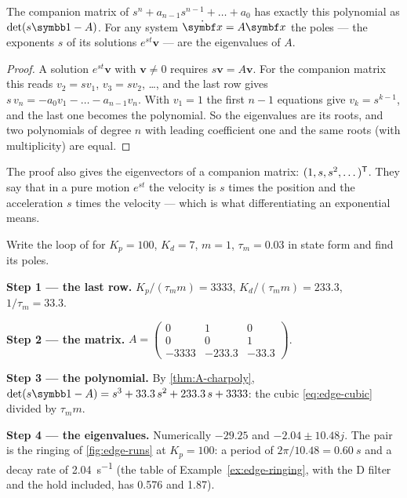 \begin{theorem}
\label{thm:A-charpoly}
The companion matrix of $s^n + a_{n-1}s^{n-1} + \dots + a_0$ has exactly this polynomial as $\det(s\Id - A)$. For any system $\dot{\vx} = A\vx$ the poles — the exponents $s$ of its solutions $e^{st}\symbf v$ — are the eigenvalues of $A$.
\end{theorem}
\begin{proof}
A solution $e^{st}\symbf v$ with $\symbf v \ne 0$ requires $s\symbf v = A\symbf v$. For the companion matrix this reads $v_2 = s v_1$, $v_3 = s v_2$, \dots, and the last row gives $s\,v_n = -a_0v_1 - \dots - a_{n-1}v_n$. With $v_1 = 1$ the first $n - 1$ equations give $v_k = s^{k-1}$, and the last one becomes the polynomial. So the eigenvalues are its roots, and two polynomials of degree $n$ with leading coefficient one and the same roots (with multiplicity) are equal.
\end{proof}

The proof also gives the eigenvectors of a companion matrix: $(1, s, s^2, \dots)^{\mathsf{T}}$. They say that in a pure motion $e^{st}$ the velocity is $s$ times the position and the acceleration $s$ times the velocity — which is what differentiating an exponential means.

\begin{example}
\label{ex:A-state}
Write the loop of  for $K_p = 100$, $K_d = 7$, $m = 1$, $\tau_m = 0.03$ in state form and find its poles.

\textbf{Step 1 — the last row.} $K_p/(\tau_m m) = 3333$, $K_d/(\tau_m m) = 233.3$, $1/\tau_m = 33.3$.

\textbf{Step 2 — the matrix.} $A = \begin{pmatrix} 0 & 1 & 0\\ 0 & 0 & 1\\ -3333 & -233.3 & -33.3\end{pmatrix}$.

\textbf{Step 3 — the polynomial.} By \cref{thm:A-charpoly}, $\det(s\Id - A) = s^3 + 33.3\,s^2 + 233.3\,s + 3333$: the cubic \eqref{eq:edge-cubic} divided by $\tau_m m$.

\textbf{Step 4 — the eigenvalues.} Numerically $-29.25$ and $-2.04 \pm 10.48j$. The pair is the ringing of \cref{fig:edge-runs} at $K_p = 100$: a period of $2\pi/10.48 = \SI{0.60}{s}$ and a decay rate of \SI{2.04}{s^{-1}} (the table of Example~\ref{ex:edge-ringing}, with the D filter and the hold included, has 0.576 and 1.87).
\end{example}

